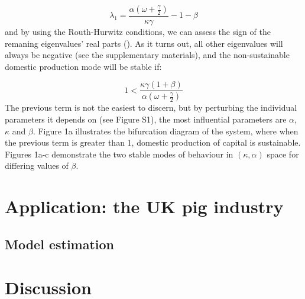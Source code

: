 \documentclass[12pt]{article}
\begin{document}
\begin{equation}
  \lambda_{1} = \frac{\alpha(\omega + \frac{\gamma}{2})}{\kappa \gamma} - 1 - \beta
\end{equation}
%
and by using the Routh-Hurwitz conditions, we can assess the sign of the remaning eigenvalues' real parts (\cite{ottoday2011}). As it turns out, all other eigenvalues will always be negative (see the supplementary materials), and the non-sustainable domestic production mode will be stable if:

\begin{equation}
  1 < \frac{ \kappa \gamma(1+\beta)}{ \alpha (\omega + \frac{\gamma}{2})}
\end{equation}
%
The previous term is not the easiest to discern, but by perturbing the individual parameters it depends on (see Figure S1), the most influential parameters are $\alpha$, $\kappa$ and $\beta$. Figure 1a illustrates the bifurcation diagram of the system, where when the previous term is greater than 1, domestic production of capital is sustainable. Figures 1a-c demonstrate the two stable modes of behaviour in $(\kappa, \alpha)$ space for differing values of $\beta$.

\section{Application: the UK pig industry}

\subsection{Model estimation}



\section{Discussion}



\newpage
\printbibliography
\end{document}
